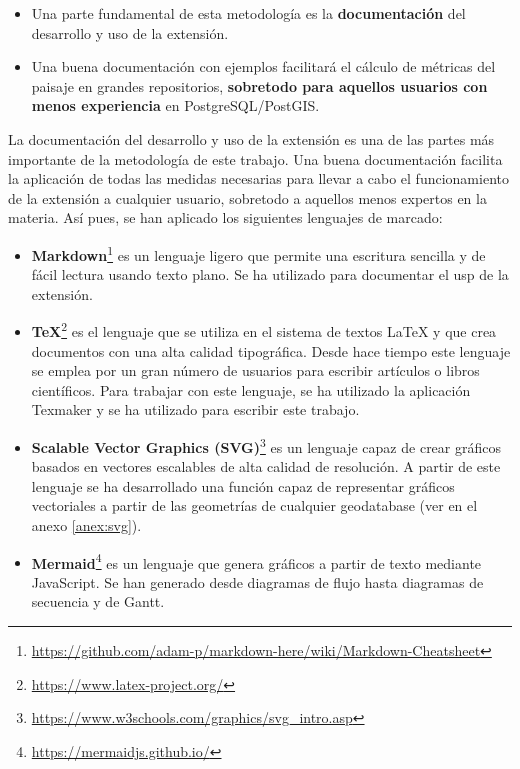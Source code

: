 \begin{graybox}
\begin{itemize}
\item Una parte fundamental de esta metodología es la \textbf{documentación} del desarrollo y uso de la extensión. 
\item Una buena documentación con ejemplos facilitará el cálculo de métricas del paisaje en grandes repositorios, \textbf{sobretodo para aquellos usuarios con menos experiencia} en PostgreSQL/PostGIS.
\end{itemize}
\end{graybox}

La documentación del desarrollo y uso de la extensión es una de las partes más importante de la metodología de este trabajo. Una buena documentación facilita la aplicación de todas las medidas necesarias para llevar a cabo el funcionamiento de la extensión a cualquier usuario, sobretodo a aquellos menos expertos en la materia. Así pues, se han aplicado los siguientes lenguajes de marcado:

\begin{itemize}
\item\textbf{Markdown}\footnote{\url{https://github.com/adam-p/markdown-here/wiki/Markdown-Cheatsheet}} es un lenguaje ligero que permite una escritura sencilla y de fácil lectura usando texto plano. Se ha utilizado para documentar el usp de la extensión.
\item\textbf{TeX}\footnote{\url{https://www.latex-project.org/}} es el lenguaje que se utiliza en el sistema de textos LaTeX y que crea documentos con una alta calidad tipográfica. Desde hace tiempo este lenguaje se emplea por un gran número de usuarios para escribir artículos o libros científicos. Para trabajar con este lenguaje, se ha utilizado la aplicación Texmaker y se ha utilizado para escribir este trabajo.
\item\textbf{Scalable Vector Graphics (SVG)}\footnote{\url{https://www.w3schools.com/graphics/svg_intro.asp}} es un lenguaje capaz de crear gráficos basados en vectores escalables de alta calidad de resolución. A partir de este lenguaje se ha desarrollado una función capaz de representar gráficos vectoriales a partir de las geometrías de cualquier geodatabase (ver en el anexo \ref{anex:svg}).
\item\textbf{Mermaid}\footnote{\url{https://mermaidjs.github.io/}} es un lenguaje que genera gráficos a partir de texto mediante JavaScript. Se han generado desde diagramas de flujo hasta diagramas de secuencia y de Gantt.
\end{itemize}

